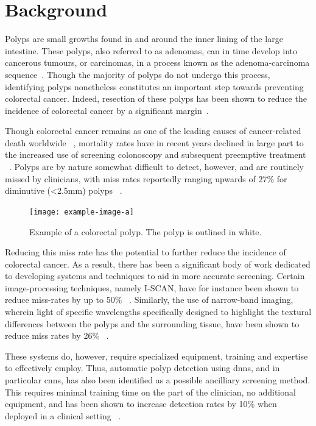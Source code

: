 \chapter{Background} \label{background}


Polyps are small growths found in and around the inner lining of the large intestine. These polyps, also referred to as adenomas, can in time develop into cancerous tumours, or carcinomas, in a process known as the adenoma-carcinoma sequence~\cite{ACS}. Though the majority of polyps do not undergo this process, identifying polyps nonetheless constitutes an important step towards preventing colorectal cancer. Indeed, resection of these polyps has been shown to reduce the incidence of colorectal cancer by a significant margin~\cite{resection}. 

Though colorectal cancer remains as one of the leading causes of cancer-related death worldwide ~\cite{colorectal_cancer}, mortality rates have in recent years declined in large part to the increased use of screening colonoscopy and subsequent preemptive treatment ~\cite{screening}. Polyps are by nature somewhat difficult to detect, however, and are routinely missed by clinicians, with miss rates reportedly ranging upwards of $27\%$ for diminutive (<2.5mm) polyps ~\cite{missrate1, missrate2}.
\begin{figure}
    \centering
    \texttt{[image: example-image-a]}
    \caption{Example of a colorectal polyp. The polyp is outlined in white.}
    \label{fig:polyp}
\end{figure}
Reducing this miss rate has the potential to further reduce the incidence of colorectal cancer. As a result, there has been a significant body of work dedicated to developing systems and techniques to aid in more accurate screening. Certain image-processing techniques, namely I-SCAN, have for instance been shown to reduce miss-rates by up to $50\%$ ~\cite{i-scan}. Similarly, the use of narrow-band imaging, wherein light of specific wavelengths specifically designed to highlight the textural differences between the polyps and the surrounding tissue, have been shown to reduce miss rates by 26\% ~\cite{nbi}. 

These systems do, however, require specialized equipment, training and expertise to effectively employ. Thus, automatic polyp detection using \glspl{dnn}, and in particular \glspl{cnn}, has also been identified as a possible ancilliary screening method. This requires minimal training time on the part of the clinician, no additional equipment, and has been shown to increase detection rates by 10\% when deployed in a clinical setting ~\cite{polyp-success-story}. 

